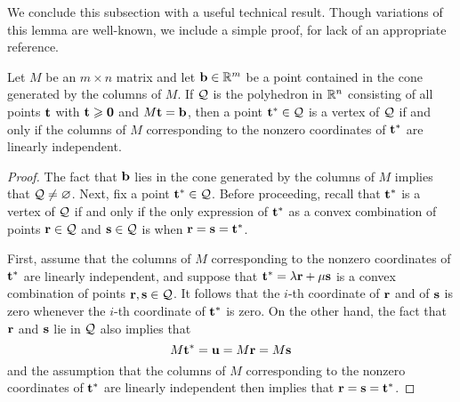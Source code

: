 \documentclass[11pt]{amsart}
\begin{document}
We conclude this subsection with a useful technical result.  Though variations of this lemma are well-known, we include a simple proof, for lack of an appropriate reference.


\begin{lemma}  
\label{vertex: L}
Let $M$ be an $m \times n$ matrix and let $\mathbf{b} \in \mathbb{R}^m$ be a point contained in the cone generated by the columns of $M$.  If $\mathcal{Q}$ is the polyhedron in $\mathbb{R}^n$  consisting of all points $\mathbf{t}$ with $\mathbf{t} \geqslant \mathbf{0}$ and $M \mathbf{t} = \mathbf{b}$, then a point $\mathbf{t}^{\ast} \in \mathcal{Q}$ is a vertex of $\mathcal{Q}$ if and only if the columns of $M$ corresponding to the nonzero coordinates of $\mathbf{t}^{\ast}$ are linearly independent.  %
\end{lemma}

\begin{proof}  The fact that $\mathbf{b}$ lies in the cone generated by the columns of $M$ implies that $\mathcal{Q} \neq  \varnothing$.  Next, fix a point $\mathbf{t}^{\ast} \in \mathcal{Q}$.  Before proceeding, recall that $\mathbf{t}^{\ast}$ is a vertex of $\mathcal{Q}$ if and only if the only expression of $\mathbf{t}^{\ast}$ as a convex combination of points $\mathbf{r} \in \mathcal{Q}$ and $\mathbf{s} \in \mathcal{Q}$ is when $\mathbf{r}=\mathbf{s}=\mathbf{t}^{\ast}$.

First, assume that the columns of $M$ corresponding to the nonzero coordinates of $\mathbf{t}^{\ast}$ are linearly independent, and suppose that $\mathbf{t}^{\ast} = \lambda \mathbf{r} + \mu \mathbf{s}$ is a convex combination of points $\mathbf{r}, \mathbf{s} \in \mathcal{Q}$.  It follows that the $i$-th coordinate of $\mathbf{r}$ and of $\mathbf{s}$ is zero whenever the $i$-th coordinate of $\mathbf{t}^{\ast}$ is zero.  On the other hand, the fact that $\mathbf{r}$ and $\mathbf{s}$ lie in $\mathcal{Q}$ also implies that 
\[ M \mathbf{t}^{\ast} = \mathbf{u} = M \mathbf{r} = M \mathbf{s} \] 
and the assumption that the columns of $M$ corresponding to the nonzero coordinates of $\mathbf{t}^{\ast}$ are linearly independent then implies that $\mathbf{r}=\mathbf{s}=\mathbf{t}^{\ast}$.


\end{proof}
\end{document}
